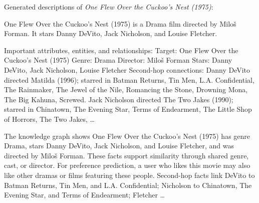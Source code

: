 \noindent Generated descriptions of \textit{One Flew Over the Cuckoo's Nest (1975)}\RunTag:
\begin{description}[style=nextline]
\item[H1P1] One Flew Over the Cuckoo's Nest (1975) is a Drama film directed by Miloš Forman. It stars Danny DeVito, Jack Nicholson, and Louise Fletcher.
\item[H2P2] Important attributes, entities, and relationships: Target: One Flew Over the Cuckoo's Nest (1975) Genre: Drama Director: Miloš Forman Stars: Danny DeVito, Jack Nicholson, Louise Fletcher Second-hop connections: Danny DeVito directed Matilda (1996); starred in Batman Returns, Tin Men, L.A. Confidential, The Rainmaker, The Jewel of the Nile, Romancing the Stone, Drowning Mona, The Big Kahuna, Screwed. Jack Nicholson directed The Two Jakes (1990); starred in Chinatown, The Evening Star, Terms of Endearment, The Little Shop of Horrors, The Two Jakes, \dots
\item[H3P3] The knowledge graph shows One Flew Over the Cuckoo's Nest (1975) has genre Drama, stars Danny DeVito, Jack Nicholson, and Louise Fletcher, and was directed by Miloš Forman. These facts support similarity through shared genre, cast, or director. For preference prediction, a user who likes this movie may also like other dramas or films featuring these people. Second-hop facts link DeVito to Batman Returns, Tin Men, and L.A. Confidential; Nicholson to Chinatown, The Evening Star, and Terms of Endearment; Fletcher \dots
\end{description}
